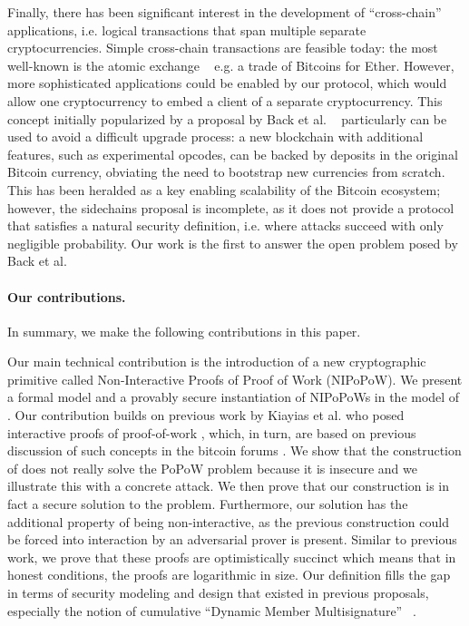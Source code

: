 Finally, there has been significant interest in the development of
``cross-chain'' applications, i.e. logical transactions that span multiple
separate cryptocurrencies. Simple cross-chain transactions are feasible today:
the most well-known is the atomic exchange ~\cite{tiernolan} e.g. a trade of
Bitcoins for Ether. However, more sophisticated applications could be enabled
by our protocol, which would allow one cryptocurrency to embed a client of a
separate cryptocurrency. This concept initially popularized by a proposal by
Back et al. ~\cite{sidechains} particularly can be used to avoid a difficult
upgrade process: a new blockchain with additional features, such as
experimental opcodes, can be backed by deposits in the original Bitcoin
currency, obviating the need to bootstrap new currencies from scratch. This
has been heralded as a key enabling scalability of the Bitcoin ecosystem;
however, the sidechains proposal is incomplete, as it does not provide a
protocol that satisfies a natural security definition, i.e. where attacks
succeed with only negligible probability. Our work is the first to answer the
open problem posed by Back et al.

\noindent
\paragraph{Our contributions.}
In summary, we make the following contributions in this paper.

Our main technical contribution is the introduction of a new cryptographic
primitive called Non-Interactive Proofs of Proof of Work (NIPoPoW). We present a
formal model and a provably secure instantiation of NIPoPoWs in the model of
\cite{backbone}. Our contribution builds on previous work by Kiayias et al. who
posed interactive proofs of proof-of-work \cite{KLS}, which, in turn, are based
on previous discussion of such concepts in the bitcoin forums \cite{highway}.
We show that the construction of \cite{KLS} does not really solve the PoPoW
problem because it is insecure and we illustrate this with a concrete attack.
We then prove that our construction is in fact a secure solution to the problem.
Furthermore, our solution has the additional property of being non-interactive,
as the previous construction could be forced into interaction by an adversarial
prover is present. Similar to previous work, we prove that these proofs are
optimistically succinct which means that in honest conditions, the proofs are
logarithmic in size. Our definition fills the gap in terms of security modeling
and design that existed in previous proposals, especially the notion of
cumulative ``Dynamic Member Multisignature'' ~\cite{sidechains}.

